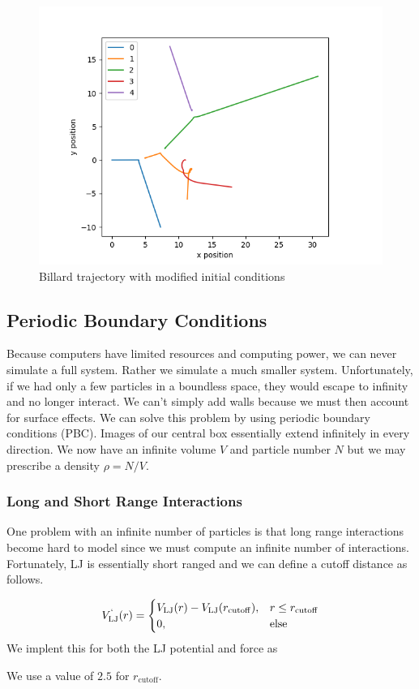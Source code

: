 \documentclass[11pt,a4paper]{scrartcl}
\makeatletter
\newcommand{\listfile}[7][MyPythonStyle]{
}
\makeatother
\begin{document}
\begin{figure}[h]
\includegraphics[width=0.7\linewidth]{../fig/billardplt.png}
  \centering
  \caption{Billard trajectory with modified initial conditions}
\label{fig:bplot}
\end{figure}
\subsection{Periodic Boundary Conditions}
Because computers have limited resources and computing power, we can never simulate a full system. Rather we simulate a much smaller system. Unfortunately, if we had only a few particles in a boundless space, they would escape to infinity and no longer interact. We can't simply add walls because we must then account for surface effects. We can solve this problem by using periodic boundary conditions (PBC).  Images of our central box essentially extend infinitely in every direction. We now have an infinite volume $V$ and particle number $N$ but we may prescribe a density $\rho = N/V$.
\subsubsection{Long and Short Range Interactions}
One problem with an infinite number of particles is that long range interactions become hard to model since we must compute an infinite number of interactions. Fortunately, LJ is essentially short ranged and we can define a cutoff distance as follows.

\begin{equation*}
V^`_\mathrm{LJ}(r)=\begin{cases}
V_\mathrm{LJ}(r) - V_\mathrm{LJ}(r_\mathrm{cutoff}), & r \leq r_\mathrm{cutoff}\\
0, & \text{else}
\end{cases}
\end{equation*}
We implent this for both the LJ potential and force as
 \listfile{../src/ljlib.py}{/src/ljlib.py}{21}{35}{LJ Cutoff}{cuttoff}
We use a value of $2.5$ for $r_\mathrm{cutoff}$.
\end{document}
